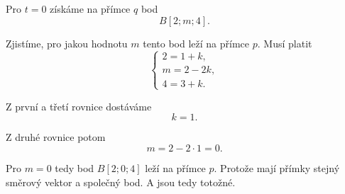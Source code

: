 \begin{example}
    Pro $t=0$ získáme na přímce $q$ bod
    \[
        B[2;m;4].
    \]

    Zjistíme, pro jakou hodnotu $m$ tento bod leží na přímce $p$.
    Musí platit
    \[
        \begin{cases}
            2=1+k,\\
            m=2-2k,\\
            4=3+k.
        \end{cases}
    \]

    Z první a třetí rovnice dostáváme
    \[
        k=1.
    \]

    Z druhé rovnice potom
    \[
        m=2-2\cdot1=0.
    \]

    Pro $m=0$ tedy bod $B[2;0;4]$ leží na přímce $p$. 
    Protože mají přímky stejný směrový vektor a společný bod. A jsou tedy totožné.
\end{example}